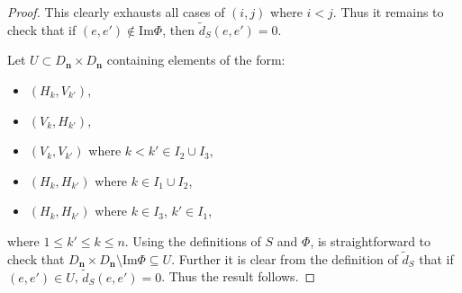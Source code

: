 \documentclass{amsart}
\newcommand{\bfn}{\mathbf{n}}
\begin{document}
\begin{proof}
This clearly exhausts all cases of $(i,j)$ where $i<j$. 
Thus it remains to check that if $(e,e')\not\in$Im$\Phi$, then $\widetilde{d}_S(e,e')=0$.

Let $U\subset D_\bfn\times D_\bfn$ containing elements of the form:
\begin{itemize}
    \item $(H_k, V_{k'})$,
    \item $(V_k, H_{k'})$,
    \item $(V_k, V_{k'})$ where $k<k'\in I_2\cup I_3$,
    \item $(H_k, H_{k'})$ where $k\in I_1\cup I_2$,
    \item $(H_k, H_{k'})$ where $k\in I_3$, $k'\in I_1$,
\end{itemize}
 where $1\leq k'\leq k\leq n$.
Using the definitions of $S$ and $\Phi$, is straightforward to check that $D_\bfn\times D_\bfn\setminus $Im$\Phi\subseteq U$. Further it is clear from the definition of $\widetilde{d}_S$ that if $(e,e')\in U$, $\widetilde{d}_S(e,e')=0$. Thus the result follows.
\end{proof}
\end{document}
